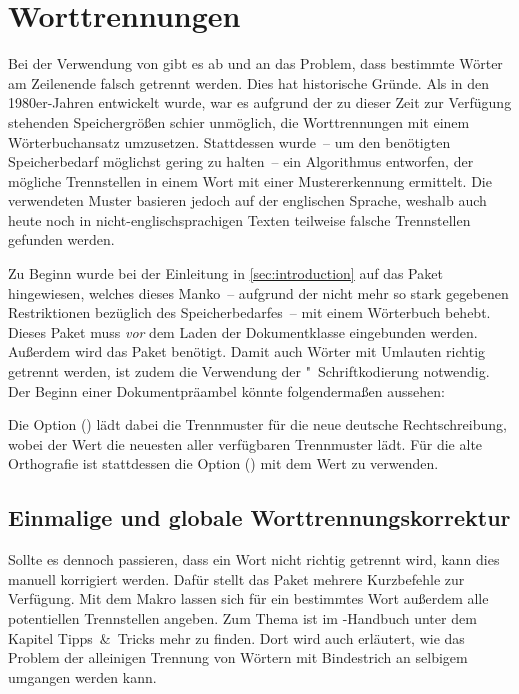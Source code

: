 \documentclass[%
  english,ngerman,%
  cdgeometry=no,DIV=12,automark,%
]{tudscrartcl}
\begin{document}
\section{Worttrennungen}
\label{sec:hyphenation}%
%
Bei der Verwendung von  gibt es ab und an das Problem, dass 
bestimmte Wörter am Zeilenende falsch getrennt werden. Dies hat historische 
Gründe. Als  in den 1980er-Jahren entwickelt wurde, war es aufgrund 
der zu dieser Zeit zur Verfügung stehenden Speichergrößen schier unmöglich, die 
Worttrennungen mit einem Wörterbuchansatz umzusetzen. Stattdessen wurde~-- um 
den benötigten Speicherbedarf möglichst gering zu halten~-- ein Algorithmus 
entworfen, der mögliche Trennstellen in einem Wort mit einer Mustererkennung 
ermittelt. Die verwendeten Muster basieren jedoch auf der englischen Sprache, 
weshalb auch heute noch in nicht-englischsprachigen Texten teilweise falsche 
Trennstellen gefunden werden.

Zu Beginn wurde bei der Einleitung in \autoref{sec:introduction} auf das Paket 
 hingewiesen, welches dieses Manko~-- aufgrund der nicht 
mehr so stark gegebenen Restriktionen bezüglich des Speicherbedarfes~-- mit 
einem Wörterbuch behebt. Dieses Paket muss \emph{vor} dem Laden der 
Dokumentklasse eingebunden werden. Außerdem wird das Paket  
benötigt. Damit auch Wörter mit Umlauten richtig getrennt werden, ist zudem die 
Verwendung der "~Schriftkodierung notwendig. Der Beginn einer 
Dokumentpräambel könnte folgendermaßen aussehen:
%
%
Die Option () lädt dabei die Trennmuster für 
die neue deutsche Rechtschreibung, wobei der Wert  die 
neuesten aller verfügbaren Trennmuster lädt. Für die alte Orthografie ist 
stattdessen die Option () mit dem Wert 
 zu verwenden.


\subsection{Einmalige und globale Worttrennungskorrektur}
Sollte es dennoch passieren, dass ein Wort nicht richtig getrennt wird, kann 
dies manuell korrigiert werden. Dafür stellt das Paket  mehrere 
Kurzbefehle zur Verfügung. Mit dem Makro  lassen sich für 
ein bestimmtes Wort außerdem alle potentiellen Trennstellen angeben. Zum Thema 
ist im \TUDScript-Handbuch unter dem Kapitel Tipps~\&~Tricks mehr zu finden. 
Dort wird auch erläutert, wie das Problem der alleinigen Trennung von Wörtern 
mit Bindestrich an selbigem umgangen werden kann.
\end{document}
